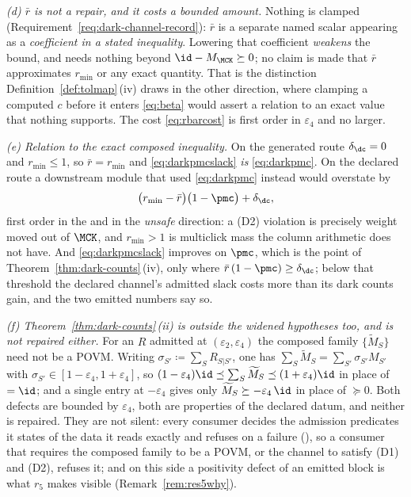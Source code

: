 \begin{remark}
\emph{(d) $\bar r$ is not a repair, and it costs a bounded amount.} Nothing is
clamped (Requirement~\ref{req:dark-channel-record}): $\bar r$ is a separate
named scalar appearing as a \emph{coefficient in a stated inequality}.
Lowering that coefficient \emph{weakens} the bound, and needs nothing beyond
$\id-M_{\MCK}\succeq0$; no claim is made that $\bar r$ approximates $r_{\min}$
or any exact quantity. That is the distinction
Definition~\ref{def:tolmap}\,(iv) draws in the other direction, where clamping
a computed $c$ before it enters \eqref{eq:beta} would assert a relation to an
exact value that nothing supports. The cost \eqref{eq:rbarcost} is first order
in $\varepsilon_4$ and no larger.

\emph{(e) Relation to the exact composed inequality.} On the generated route
$\delta_{\dc}=0$ and $r_{\min}\le1$, so $\bar r=r_{\min}$ and
\eqref{eq:darkpmcslack} \emph{is} \eqref{eq:darkpmc}. On the declared route a
downstream module that used \eqref{eq:darkpmc} instead would overstate by
\begin{equation}\label{eq:darkoverstate}
  \big(r_{\min}-\bar r\big)\big(1-\pmc\big)+\delta_{\dc} ,
\end{equation}
first order in the  and in the \emph{unsafe} direction: a
(D2) violation is precisely weight moved out of $\MCK$, and $r_{\min}>1$ is
multiclick mass the column arithmetic does not have. And
\eqref{eq:darkpmcslack} improves on $\pmc$, which is the point of
Theorem~\ref{thm:dark-counts}\,(iv), only where $\bar r\,(1-\pmc)\ge\delta_{\dc}$;
below that threshold the declared channel's admitted slack costs more than its
dark counts gain, and the two emitted numbers say so.

\emph{(f) Theorem~\ref{thm:dark-counts}\,(ii) is outside the widened hypotheses too,
and is not repaired either.} For an $R$ admitted at
$(\varepsilon_2,\varepsilon_4)$ the composed family $\{\widetilde M_S\}$ need
not be a POVM. Writing $\sigma_{S'}\coloneqq\sum_SR_{S|S'}$, one has
$\sum_S\widetilde M_S=\sum_{S'}\sigma_{S'}M_{S'}$ with
$\sigma_{S'}\in[1-\varepsilon_4,1+\varepsilon_4]$, so
$(1-\varepsilon_4)\id\preceq\sum_S\widetilde M_S\preceq(1+\varepsilon_4)\id$
in place of $=\id$; and a single entry at $-\varepsilon_4$ gives only
$\widetilde M_S\succeq-\varepsilon_4\,\id$ in place of $\succeq0$. Both defects
are bounded by $\varepsilon_4$, both are properties of the declared datum, and
neither is repaired. They are not silent: every consumer decides the
admission predicates it states of the data it reads exactly and refuses on a
failure (), so a consumer that
requires the composed family to be a POVM, or the channel to satisfy (D1) and
(D2), refuses it; and on this side a positivity defect of an emitted block is
what $r_5$ makes visible (Remark~\ref{rem:res5why}).
\end{remark}
